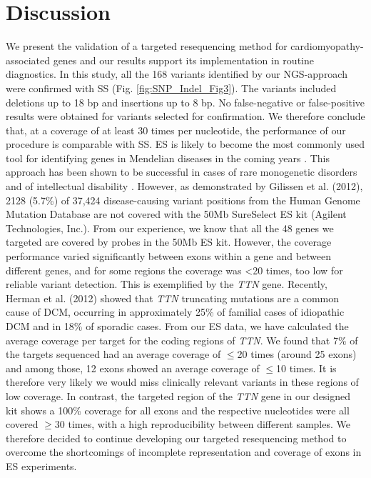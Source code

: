 \section{Discussion}\label{discussion}
We present the validation of a targeted resequencing method for cardiomyopathy-associated genes and our results support its implementation in routine diagnostics. 
In this study, all the 168 variants identified by our NGS-approach were confirmed with SS (Fig.  \ref{fig:SNP_Indel_Fig3}). 
The variants included deletions up to 18 bp and insertions up to 8 bp. 
No false-negative or false-positive results were obtained for variants selected for confirmation. 
We therefore conclude that, at a coverage of at least 30 times per nucleotide, the performance of our procedure is comparable with SS. 
ES is likely to become the most commonly used tool for identifying genes in Mendelian diseases in the coming years \cite{Gilissen_2012}.
This approach has been shown to be successful in cases of rare monogenetic disorders \cite{Gilissen_2010,Hoischen_2010,Ng_2010} and of intellectual disability \cite{Vissers_2010}. 
However, as demonstrated by Gilissen et al. (2012)\cite{Gilissen_2012}, 2128 (5.7\%) of 37,424 disease-causing variant positions from the Human Genome Mutation Database are not covered with the 50Mb SureSelect ES kit (Agilent Technologies, Inc.). 
From our experience, we know that all the 48 genes we targeted are covered by probes in the 50Mb ES kit. 
However, the coverage performance varied significantly between exons within a gene and between different genes, and for some regions the coverage was {\textless}20 times, too low for reliable variant detection. 
This is exemplified by the \textsl{TTN} gene. 
Recently, Herman et al. (2012)\cite{Herman_2012} showed that \textsl{TTN} truncating mutations are a common cause of DCM, occurring in approximately 25\% of familial cases of idiopathic DCM and in 18\% of sporadic cases. 
From our ES data, we have calculated the average coverage per target for the coding regions of \textsl{TTN}. 
We found that 7\% of the targets sequenced had an average coverage of $\le$20 times (around 25 exons) and among those, 12 exons showed an average coverage of $\le$10 times. 
It is therefore very likely we would miss clinically relevant variants in these regions of low coverage. 
In contrast, the targeted region of the \textsl{TTN} gene in our designed kit shows a 100\% coverage for all exons and the respective nucleotides were all covered $\ge$30 times, with a high reproducibility between different samples. 
We therefore decided to continue developing our targeted resequencing method to overcome the shortcomings of incomplete representation and coverage of exons in ES experiments. 

